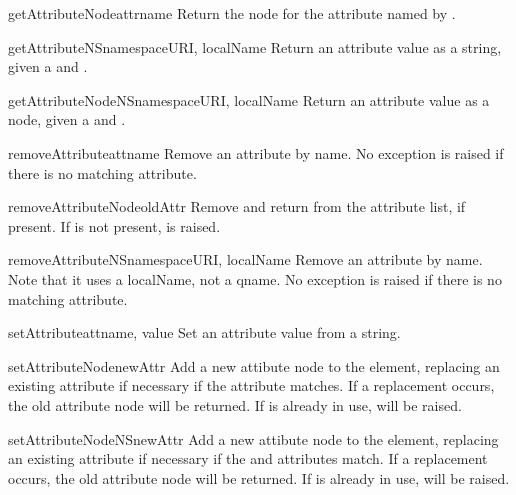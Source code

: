 \begin{methoddesc}[Element]{getAttributeNode}{attrname}
Return the  node for the attribute named by
.
\end{methoddesc}

\begin{methoddesc}[Element]{getAttributeNS}{namespaceURI, localName}
Return an attribute value as a string, given a  and
.
\end{methoddesc}

\begin{methoddesc}[Element]{getAttributeNodeNS}{namespaceURI, localName}
Return an attribute value as a node, given a  and
.
\end{methoddesc}

\begin{methoddesc}[Element]{removeAttribute}{attname}
Remove an attribute by name.  No exception is raised if there is no
matching attribute.
\end{methoddesc}

\begin{methoddesc}[Element]{removeAttributeNode}{oldAttr}
Remove and return  from the attribute list, if present.
If  is not present,  is raised.
\end{methoddesc}

\begin{methoddesc}[Element]{removeAttributeNS}{namespaceURI, localName}
Remove an attribute by name.  Note that it uses a localName, not a
qname.  No exception is raised if there is no matching attribute.
\end{methoddesc}

\begin{methoddesc}[Element]{setAttribute}{attname, value}
Set an attribute value from a string.
\end{methoddesc}

\begin{methoddesc}[Element]{setAttributeNode}{newAttr}
Add a new attibute node to the element, replacing an existing
attribute if necessary if the  attribute matches.  If a
replacement occurs, the old attribute node will be returned.  If
 is already in use,  will be
raised.
\end{methoddesc}

\begin{methoddesc}[Element]{setAttributeNodeNS}{newAttr}
Add a new attibute node to the element, replacing an existing
attribute if necessary if the  and
 attributes match.  If a replacement occurs, the old
attribute node will be returned.  If  is already in use,
 will be raised.
\end{methoddesc}

